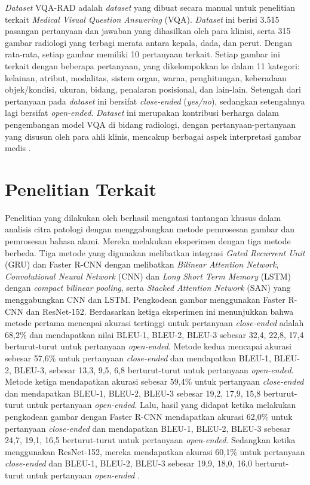 \par \textit{Dataset} VQA-RAD adalah \textit{dataset} yang dibuat secara manual untuk penelitian terkait \textit{Medical Visual Question Answering} (VQA). \textit{Dataset} ini berisi 3.515 pasangan pertanyaan dan jawaban yang dihasilkan oleh para klinisi, serta 315 gambar radiologi yang terbagi merata antara kepala, dada, dan perut. Dengan rata-rata, setiap gambar memiliki 10 pertanyaan terkait. Setiap gambar ini terkait dengan beberapa pertanyaan, yang dikelompokkan ke dalam 11 kategori: kelainan, atribut, modalitas, sistem organ, warna, penghitungan, keberadaan objek/kondisi, ukuran, bidang, penalaran posisional, dan lain-lain. Setengah dari pertanyaan pada \textit{dataset} ini bersifat \textit{close-ended} (\textit{yes/no}), sedangkan setengahnya lagi bersifat \textit{open-ended}. \textit{Dataset} ini merupakan kontribusi berharga dalam pengembangan model VQA di bidang radiologi, dengan pertanyaan-pertanyaan yang disusun oleh para ahli klinis, mencakup berbagai aspek interpretasi gambar medis \citep{lau2018dataset}.



\section{Penelitian Terkait}

\par Penelitian yang dilakukan oleh \citep{xuehai2020pathvqa} berhasil mengatasi tantangan khusus dalam analisis citra patologi dengan menggabungkan metode pemrosesan gambar dan pemrosesan bahasa alami. Mereka melakukan eksperimen dengan tiga metode berbeda. Tiga metode yang digunakan melibatkan integrasi \textit{Gated Recurrent Unit} (GRU) dan Faster R-CNN dengan melibatkan \textit{Bilinear Attention Network}, \textit{Convolutional Neural Network} (CNN) dan \textit{Long Short Term Memory} (LSTM) dengan \textit{compact bilinear pooling}, serta \textit{Stacked Attention Network} (SAN) yang menggabungkan CNN dan LSTM. Pengkodean gambar menggunakan Faster R-CNN dan ResNet-152. Berdasarkan ketiga eksperimen ini menunjukkan bahwa metode pertama mencapai akurasi tertinggi untuk pertanyaan \textit{close-ended} adalah 68,2\% dan mendapatkan nilai BLEU-1, BLEU-2, BLEU-3 sebesar 32,4, 22,8, 17,4 berturut-turut untuk pertanyaan \textit{open-ended}. Metode kedua mencapai akurasi sebesar 57,6\% untuk pertanyaan \textit{close-ended} dan mendapatkan BLEU-1, BLEU-2, BLEU-3, sebesar 13,3, 9,5, 6,8 berturut-turut untuk pertanyaan \textit{open-ended}. Metode ketiga mendapatkan akurasi sebesar 59,4\% untuk pertanyaan \textit{close-ended} dan mendapatkan BLEU-1, BLEU-2, BLEU-3 sebesar 19,2, 17,9, 15,8 berturut-turut untuk pertanyaan \textit{open-ended}. Lalu, hasil yang didapat ketika melakukan pengkodean gambar dengan Faster R-CNN mendapatkan akurasi 62,0\% untuk pertanyaan \textit{close-ended} dan mendapatkan BLEU-1, BLEU-2, BLEU-3 sebesar 24,7, 19,1, 16,5 berturut-turut untuk pertanyaan \textit{open-ended}. Sedangkan ketika menggunakan ResNet-152, mereka mendapatkan akurasi 60,1\% untuk pertanyaan \textit{close-ended} dan BLEU-1, BLEU-2, BLEU-3 sebesar 19,9, 18,0, 16,0 berturut-turut untuk pertanyaan \textit{open-ended} \citep{xuehai2020pathvqa}.

